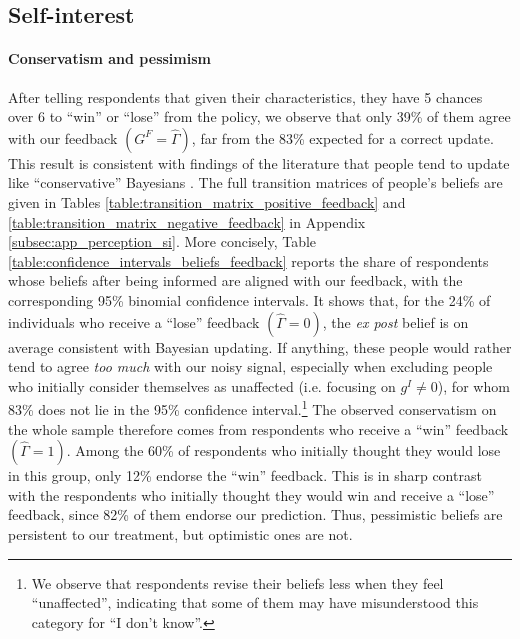 \documentclass[12pt]{article} %
\begin{document}

	\subsection{Self-interest}\label{subsec:update_si}

\paragraph{Conservatism and pessimism}

After telling respondents that given their characteristics, they have 5 chances over 6 to ``win'' or ``lose'' from the policy, we observe that only 39\% of them agree with our feedback $(G^F = \widehat{\Gamma})$, far from the 83\% expected for a correct update. This result is consistent with findings of the literature that people tend to update like ``conservative'' Bayesians \citep{edwards_conservatism_1968}. The full transition matrices of people's beliefs are given in Tables \ref{table:transition_matrix_positive_feedback} and \ref{table:transition_matrix_negative_feedback} in Appendix \ref{subsec:app_perception_si}. More concisely, Table \ref{table:confidence_intervals_beliefs_feedback} reports the share of respondents whose beliefs after being informed are aligned with our feedback, with the corresponding 95\% binomial confidence intervals. It shows that, for the 24\% of individuals who receive a ``lose'' feedback $(\widehat{\Gamma} = 0)$, the \textit{ex post} belief is on average consistent with Bayesian updating. If anything, these people would rather tend to agree \textit{too much} with our noisy signal, especially when excluding people who initially consider themselves as unaffected (i.e. focusing on $g^I \neq 0$), for whom 83\% does not lie in the 95\% confidence interval.\footnote{We observe that respondents revise their beliefs less when they feel ``unaffected'', indicating that some of them may have misunderstood this category for ``I don't know''.} The observed conservatism on the whole sample therefore comes from respondents who receive a ``win'' feedback $(\widehat{\Gamma} = 1)$. Among the 60\% of respondents who initially thought they would lose in this group, only 12\% endorse the ``win'' feedback. This is in sharp contrast with the respondents who initially thought they would win and receive a ``lose'' feedback, since 82\% of them endorse our prediction. Thus, pessimistic beliefs are persistent to our treatment, but optimistic ones are not.
\end{document}
